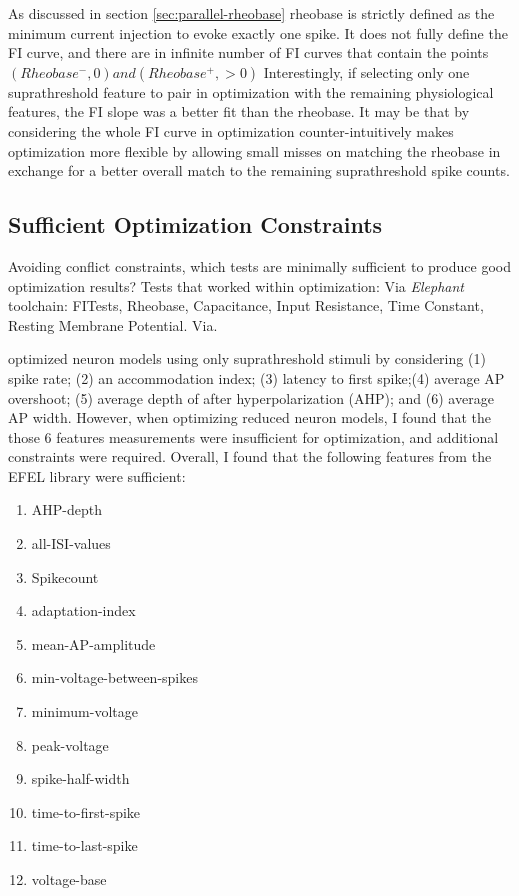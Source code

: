 As discussed in section \ref{sec:parallel-rheobase} rheobase is strictly defined as the minimum current injection to evoke exactly one spike.
It does not fully define the FI curve, and there are in infinite number of FI curves that contain the points $(Rheobase^-, 0) and (Rheobase^+, >0)$
Interestingly, if selecting only one suprathreshold feature to pair in optimization with the remaining physiological features, the FI slope was a better fit than the rheobase.
It may be that by considering the whole FI curve in optimization counter-intuitively makes optimization more flexible by allowing small misses on matching the rheobase in exchange for a better overall match to the remaining suprathreshold spike counts.

\subsection{Sufficient Optimization Constraints}
Avoiding conflict constraints, which tests are minimally sufficient to produce good optimization results?
Tests that worked within optimization:
Via \emph{Elephant} toolchain: FITests, Rheobase, Capacitance, Input Resistance, Time Constant, Resting Membrane Potential.
Via. 

\cite{druckmann2007novel} optimized neuron models using only suprathreshold stimuli by considering (1) spike rate; (2) an accommodation index; (3) latency to first spike;(4) average AP overshoot; (5) average depth of after hyperpolarization (AHP); and (6) average AP width.
However, when optimizing reduced neuron models, I found that the those 6 features measurements were insufficient for optimization, and additional constraints were required.
Overall, I found that the following features from the EFEL library were sufficient:
\begin{enumerate}
\item AHP-depth
\item all-ISI-values
\item Spikecount %
\item adaptation-index
\item mean-AP-amplitude
\item min-voltage-between-spikes
\item minimum-voltage
\item peak-voltage
\item spike-half-width
\item time-to-first-spike
\item time-to-last-spike
\item voltage-base
\end{enumerate}

